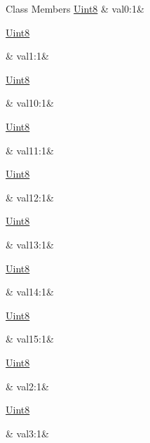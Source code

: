 \begin{DoxyFields}{Class Members}
\hypertarget{a00001_a8664dccd1d83673d4fa8ef755ae88439}{\hyperlink{a00001_a979e3e23b9a449e69ab6a8a83b6042f8}{Uint8}}\label{a00001_a8664dccd1d83673d4fa8ef755ae88439}
&
val0\+:1&
\\
\hline

\hypertarget{a00001_a8de92ce2033cf3ca03fa8cc63e7a703f}{\hyperlink{a00001_a979e3e23b9a449e69ab6a8a83b6042f8}{Uint8}}\label{a00001_a8de92ce2033cf3ca03fa8cc63e7a703f}
&
val1\+:1&
\\
\hline

\hypertarget{a00001_a0d3609924f13ec246a388122b57593c9}{\hyperlink{a00001_a979e3e23b9a449e69ab6a8a83b6042f8}{Uint8}}\label{a00001_a0d3609924f13ec246a388122b57593c9}
&
val10\+:1&
\\
\hline

\hypertarget{a00001_a3acb8db62b854be1de3758f9b78b7849}{\hyperlink{a00001_a979e3e23b9a449e69ab6a8a83b6042f8}{Uint8}}\label{a00001_a3acb8db62b854be1de3758f9b78b7849}
&
val11\+:1&
\\
\hline

\hypertarget{a00001_a6cdb30c0ed29cbc7e6db34755d055019}{\hyperlink{a00001_a979e3e23b9a449e69ab6a8a83b6042f8}{Uint8}}\label{a00001_a6cdb30c0ed29cbc7e6db34755d055019}
&
val12\+:1&
\\
\hline

\hypertarget{a00001_aacea3c58607082322a54a1915e5e1761}{\hyperlink{a00001_a979e3e23b9a449e69ab6a8a83b6042f8}{Uint8}}\label{a00001_aacea3c58607082322a54a1915e5e1761}
&
val13\+:1&
\\
\hline

\hypertarget{a00001_ae16f110e9441f8262ee98e1fa6a66043}{\hyperlink{a00001_a979e3e23b9a449e69ab6a8a83b6042f8}{Uint8}}\label{a00001_ae16f110e9441f8262ee98e1fa6a66043}
&
val14\+:1&
\\
\hline

\hypertarget{a00001_a09cb9e8a5b976b5d2368a2a146f5e7e9}{\hyperlink{a00001_a979e3e23b9a449e69ab6a8a83b6042f8}{Uint8}}\label{a00001_a09cb9e8a5b976b5d2368a2a146f5e7e9}
&
val15\+:1&
\\
\hline

\hypertarget{a00001_a38ceaa3b09c5a07d329888ba1ccde9ad}{\hyperlink{a00001_a979e3e23b9a449e69ab6a8a83b6042f8}{Uint8}}\label{a00001_a38ceaa3b09c5a07d329888ba1ccde9ad}
&
val2\+:1&
\\
\hline

\hypertarget{a00001_a9163c8c66d03c512404cca8549a250e7}{\hyperlink{a00001_a979e3e23b9a449e69ab6a8a83b6042f8}{Uint8}}\label{a00001_a9163c8c66d03c512404cca8549a250e7}
&
val3\+:1&
\\
\hline


\end{DoxyFields}
